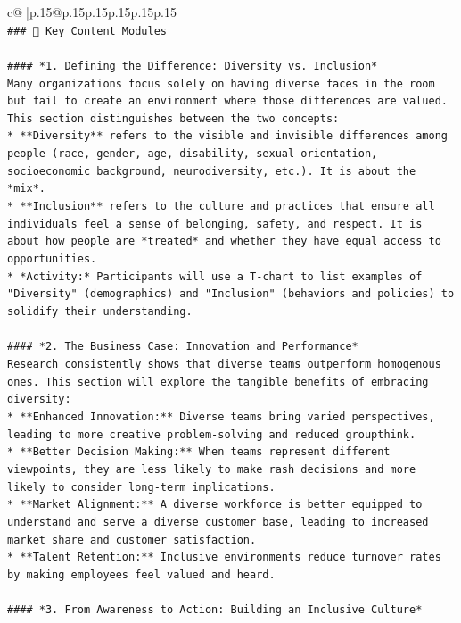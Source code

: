 \documentclass{article}
\begin{document}
{\begin{supertabular}{c@{$\;$}|p{.15\linewidth}@{}p{.15\linewidth}p{.15\linewidth}p{.15\linewidth}p{.15\linewidth}p{.15\linewidth}}
{{{\\ 
\texttt{\#\#\# 🧠 Key Content Modules} \\
\\ 
\texttt{\#\#\#\# *1. Defining the Difference: Diversity vs. Inclusion*} \\
\texttt{Many organizations focus solely on having diverse faces in the room but fail to create an environment where those differences are valued. This section distinguishes between the two concepts:} \\
\texttt{*   **Diversity** refers to the visible and invisible differences among people (race, gender, age, disability, sexual orientation, socioeconomic background, neurodiversity, etc.). It is about the *mix*.} \\
\texttt{*   **Inclusion** refers to the culture and practices that ensure all individuals feel a sense of belonging, safety, and respect. It is about how people are *treated* and whether they have equal access to opportunities.} \\
\texttt{*   *Activity:* Participants will use a T{-}chart to list examples of "Diversity" (demographics) and "Inclusion" (behaviors and policies) to solidify their understanding.} \\
\\ 
\texttt{\#\#\#\# *2. The Business Case: Innovation and Performance*} \\
\texttt{Research consistently shows that diverse teams outperform homogenous ones. This section will explore the tangible benefits of embracing diversity:} \\
\texttt{*   **Enhanced Innovation:** Diverse teams bring varied perspectives, leading to more creative problem{-}solving and reduced groupthink.} \\
\texttt{*   **Better Decision Making:** When teams represent different viewpoints, they are less likely to make rash decisions and more likely to consider long{-}term implications.} \\
\texttt{*   **Market Alignment:** A diverse workforce is better equipped to understand and serve a diverse customer base, leading to increased market share and customer satisfaction.} \\
\texttt{*   **Talent Retention:** Inclusive environments reduce turnover rates by making employees feel valued and heard.} \\
\\ 
\texttt{\#\#\#\# *3. From Awareness to Action: Building an Inclusive Culture*} \\
}}}
\end{supertabular}}
\end{document}
